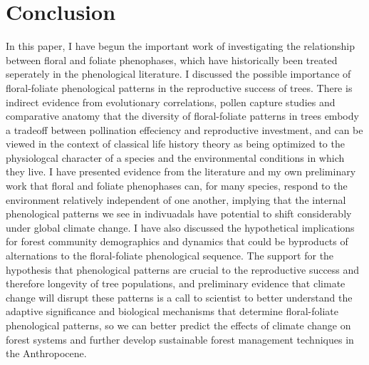 \documentclass{article}\usepackage[]{graphicx}\usepackage[]{color}
\begin{document}
\section*{Conclusion}
In this paper,  I have begun the important work of investigating the relationship between floral and foliate phenophases, which have historically been treated seperately in the phenological literature. I discussed the possible importance of floral-foliate phenological patterns in the reproductive success of trees. There is indirect evidence from evolutionary correlations, pollen capture studies and comparative anatomy that the diversity of floral-foliate patterns in trees embody a tradeoff between pollination effeciency and reproductive investment, and can be viewed in the context of classical life history theory as being optimized to the physiologcal character of a species and the environmental conditions in which they live. I have presented evidence from the literature and my own preliminary work that floral and foliate phenophases can, for many species, respond to the environment relatively independent of one another, implying that the internal phenological patterns we see in indivuadals have potential to shift considerably under global climate change. I have also discussed the hypothetical implications for forest community demographics and dynamics that could be byproducts of alternations to the floral-foliate phenological sequence. The support for the hypothesis that phenological patterns are crucial to the reproductive success and therefore longevity of tree populations, and preliminary evidence that climate change will disrupt these patterns is a call to scientist to better understand the adaptive significance and biological mechanisms that determine floral-foliate phenological patterns, so we can better predict the effects of climate change on forest systems and further develop sustainable forest management techniques in the Anthropocene.



\end{document}
